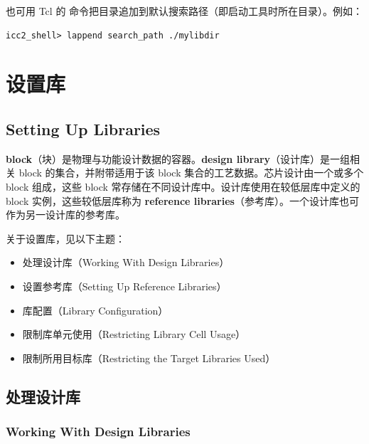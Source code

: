 也可用 Tcl 的  命令把目录追加到默认搜索路径（即启动工具时所在目录）。例如：
\begin{lstlisting}
icc2_shell> lappend search_path ./mylibdir
\end{lstlisting}

\section{设置库}
\subsection*{Setting Up Libraries}

\textbf{block}（块）是物理与功能设计数据的容器。\textbf{design library}（设计库）是一组相关 block 的集合，并附带适用于该 block 集合的工艺数据。芯片设计由一个或多个 block 组成，这些 block 常存储在不同设计库中。设计库使用在较低层库中定义的 block 实例，这些较低层库称为 \textbf{reference libraries}（参考库）。一个设计库也可作为另一设计库的参考库。

关于设置库，见以下主题：
\begin{itemize}
  \item 处理设计库（Working With Design Libraries）
  \item 设置参考库（Setting Up Reference Libraries）
  \item 库配置（Library Configuration）
  \item 限制库单元使用（Restricting Library Cell Usage）
  \item 限制所用目标库（Restricting the Target Libraries Used）
\end{itemize}

\subsection{处理设计库}
\subsubsection*{Working With Design Libraries}

